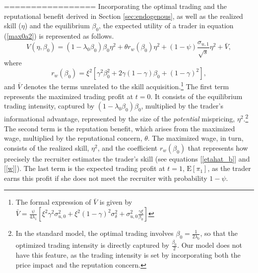 =================
Incorporating the optimal trading and the reputational benefit derived in Section \ref{sec:endogenous}, as well as the realized skill ($\eta$) and the equilibrium $\beta_{0}$, the expected utility of a trader in equation (\ref{max0a2}) is represented as follows.
\begin{equation}
V(\eta, \beta_{0}) = (1-\lambda_{0}\beta_{0})\beta_{0}\eta^2 + \theta r_{w}(\beta_{0})\eta^2 + (1-\psi)\frac{\sigma_{u,1}}{\sqrt{s}}\eta^2 + \bar{V}, \label{eq:Veta}
\end{equation}
where
\begin{equation}
r_{w}(\beta_{0}) = \xi^2 \left[\gamma^2 \beta_{0}^2 + 2\gamma(1-\gamma)\beta_{0} + (1-\gamma)^2  \right], \label{eq:r_w}
\end{equation}
and $\bar{V}$ denotes the terms unrelated to the skill acquisition.\footnote{The formal expression of $\bar{V}$ is given by $\bar{V} =\frac{\psi}{4\lambda_{1}}\left[{\xi}^{2}\gamma^{2}\sigma_{u,0}^{2}+\xi^{2}(1-\gamma)^{2}\sigma_{\delta}^{2}+\sigma_{u,0}^{2}\frac{\gamma\xi}{\beta_{0}}\right]$} The first term represents the maximized trading profit at $t=0$. It consists of the equilibrium trading intensity, captured by $(1-\lambda_{0}\beta_{0})\beta_{0}$, multiplied by the trader's informational advantage, represented by the size of the \textit{potential} mispricing, $\eta^2$.\footnote{In the standard \citet{kyle1985continuous} model, the optimal trading involves $\beta_{0} = \frac{1}{2\lambda_{0}}$, so that the optimized trading intensity is directly captured by $\frac{\beta_{0}}{2}$. Our model does not have this feature, as the trading intensity is set by incorporating both the price impact and the reputation concern.} The second term is the reputation benefit, which arises from the maximized wage, multiplied by the reputational concern, $\theta$. The maximized wage, in turn, consists of the realized skill, $\eta^2$, and the coefficient $r_{w}(\beta_{0})$ that represents how precisely the recruiter estimates the trader's skill (see equations [\ref{etahat_b}] and [\ref{w}]). The last term is the expected trading profit at $t=1$, $\mathrm{E}[\pi_{1}]$, as the trader earns this profit if she does not meet the recruiter with probability $1-\psi$. 

